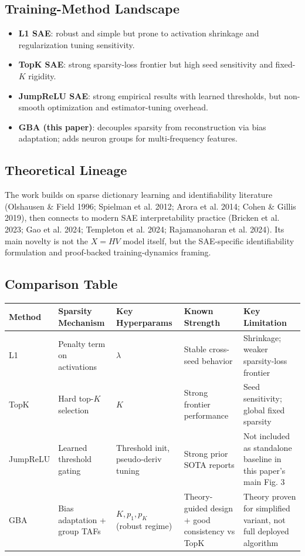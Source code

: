 \documentclass[11pt,a4paper]{article}
\begin{document}
\subsection*{Training-Method Landscape}
\begin{itemize}[leftmargin=*]
\item \textbf{L1 SAE}: robust and simple but prone to activation shrinkage and regularization tuning sensitivity.
\item \textbf{TopK SAE}: strong sparsity-loss frontier but high seed sensitivity and fixed-$K$ rigidity.
\item \textbf{JumpReLU SAE}: strong empirical results with learned thresholds, but non-smooth optimization and estimator-tuning overhead.
\item \textbf{GBA (this paper)}: decouples sparsity from reconstruction via bias adaptation; adds neuron groups for multi-frequency features.
\end{itemize}

\subsection*{Theoretical Lineage}
The work builds on sparse dictionary learning and identifiability literature (Olshausen \& Field 1996; Spielman et al. 2012; Arora et al. 2014; Cohen \& Gillis 2019), then connects to modern SAE interpretability practice (Bricken et al. 2023; Gao et al. 2024; Templeton et al. 2024; Rajamanoharan et al. 2024). Its main novelty is not the $X=HV$ model itself, but the SAE-specific identifiability formulation and proof-backed training-dynamics framing.

\subsection*{Comparison Table}
\begin{tabularx}{\textwidth}{p{2.2cm}p{2.2cm}p{2.2cm}p{2.5cm}X}
\toprule
\textbf{Method} & \textbf{Sparsity Mechanism} & \textbf{Key Hyperparams} & \textbf{Known Strength} & \textbf{Key Limitation} \\
\midrule
L1 & Penalty term on activations & $\lambda$ & Stable cross-seed behavior & Shrinkage; weaker sparsity-loss frontier \\
TopK & Hard top-$K$ selection & $K$ & Strong frontier performance & Seed sensitivity; global fixed sparsity \\
JumpReLU & Learned threshold gating & Threshold init, pseudo-deriv tuning & Strong prior SOTA reports & Not included as standalone baseline in this paper's main Fig. 3 \\
GBA & Bias adaptation + group TAFs & $K, p_1, p_K$ (robust regime) & Theory-guided design + good consistency vs TopK & Theory proven for simplified variant, not full deployed algorithm \\
\bottomrule
\end{tabularx}
\end{document}
